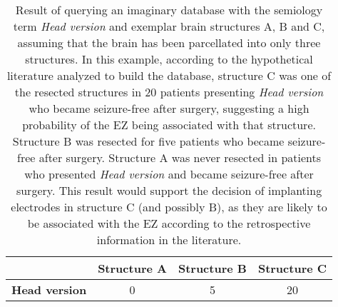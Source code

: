 \begin{table}[hb]
  \setlength{\tabcolsep}{3pt}
  \centering
  \caption[Result of querying a database with the term \textit{Head version}]{
    Result of querying an imaginary database with the semiology term \textit{Head version} and exemplar brain structures A, B and C, assuming that the brain has been parcellated into only three structures.
    In this example, according to the hypothetical literature analyzed to build the database, structure C was one of the resected structures in 20 patients presenting \textit{Head version} who became seizure-free after surgery, suggesting a high probability of the \ac{EZ} being associated with that structure.
    Structure B was resected for five patients who became seizure-free after surgery.
    Structure A was never resected in patients who presented \textit{Head version} and became seizure-free after surgery.
    This result would support the decision of implanting electrodes in structure C (and possibly B), as they are likely to be associated with the \ac{EZ} according to the retrospective information in the literature.
  }
  \label{tab:single_semiology}
  \begin{tabular}{l*3c}
    \toprule
                          & \textbf{Structure A} & \textbf{Structure B} & \textbf{Structure C} \\
    \midrule
    \textbf{Head version} &                    0 &                    5 &                   20 \\
  \end{tabular}
\end{table}
